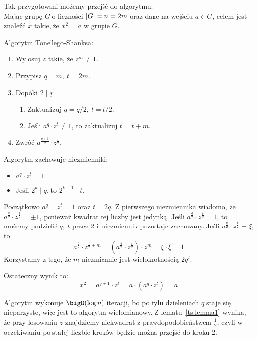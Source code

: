 Tak przygotowani możemy przejść do algorytmu: \\
Mając grupę \( G \) o liczności \( \left\lvert G\right\rvert = n = 2m \) oraz dane na wejściu \( a \in G \), celem jest znaleźć \( x \) takie, że \( x^2 = a \) w grupie \( G \).
\begin{greyframe}
	Algorytm Tonellego-Shanksa:
	\begin{enumerate}
		\item Wylosuj \( z \) takie, że \( z^m \neq 1 \).
		\item Przypisz \( q = m, \ t = 2m \).
		\item Dopóki \( 2 \mid q \):
		      \begin{enumerate}
			      \item Zaktualizuj \( q = q / 2, \ t = t / 2 \).
			      \item Jeśli \( a^q \cdot z^t \neq 1 \), to zaktualizuj \( t = t + m \).
		      \end{enumerate}
		\item Zwróć \( a^{\frac{q+1}{2}} \cdot z^{\frac{t}{2}} \).
	\end{enumerate}
\end{greyframe}
Algorytm zachowuje niezmienniki:
\begin{itemize}
	\item \( a^q \cdot z^t = 1 \)
	\item Jeśli \( 2^k \mid q \), to \( 2^{k+1} \mid t \).
\end{itemize}
Początkowo \(a^q = z^t = 1 \) oraz \( t = 2q \).
Z pierwszego niezmiennika wiadomo, że \( a^{\frac{q}{2}} \cdot z^{\frac{t}{2}} = \pm 1 \), ponieważ kwadrat tej liczby jest jedynką.
Jeśli \( a^{\frac{q}{2}} \cdot z^{\frac{t}{2}} = 1 \), to możemy podzielić \( q, \ t \) przez 2 i~niezmiennik pozostaje zachowany.
Jeśli \( a^{\frac{q}{2}} \cdot z^{\frac{t}{2}} = \xi \), to
\[
	a^{\frac{q}{2}} \cdot z^{\frac{t}{2} + m} = (a^{\frac{q}{2}} \cdot z^{\frac{t}{2}}) \cdot z^m = \xi \cdot \xi = 1
\]
Korzystamy z tego, że \( m \) niezmiennie jest wielokrotnością \( 2q' \).

Ostateczny wynik to:
\[
	x^2 = a^{q+1} \cdot z^t = a \cdot (a^q \cdot z^t) = a
\]

Algorytm wykonuje \( \bigO(\log n) \) iteracji, bo po tylu dzieleniach \( q \) staje się nieparzyste, więc jest to algorytm wielomianowy.
Z lematu~\ref{ts:lemma1} wynika, że przy losowaniu \( z \) znajdziemy niekwadrat z prawdopodobieństwem \( \frac{1}{2} \), czyli w oczekiwaniu po stałej liczbie kroków będzie można przejść do kroku 2.
